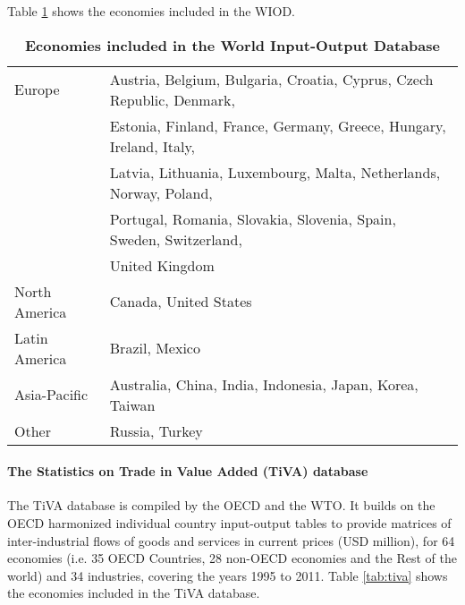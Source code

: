 \documentclass[11pt,a4paper]{article}
\begin{document}

Table \ref{tab:wiod} shows the economies included in the WIOD.
 
 
\begin{table}[!h]
\begin{threeparttable}
\centering
\centering
\caption{\small{\textbf{Economies included in the World Input-Output Database}}}
\small
\begin{tabular}{ll}
\hline\hline
Europe & Austria, Belgium, Bulgaria, Croatia, Cyprus, Czech Republic, Denmark,\\
& Estonia, Finland, France, Germany, Greece, Hungary, Ireland, Italy,\\
& Latvia, Lithuania, Luxembourg, Malta, Netherlands, Norway, Poland,\\
&Portugal, Romania, Slovakia, Slovenia, Spain, Sweden, Switzerland,\\
& United Kingdom\\
North  America& Canada, United States\\
Latin America & Brazil, Mexico \\
Asia-Pacific & Australia, China, India, Indonesia, Japan, Korea, Taiwan\\
Other & Russia, Turkey\\
\hline\hline
\end{tabular} 
\label{tab:wiod}
\end{threeparttable}
\end{table} 

\paragraph{The Statistics on Trade in Value Added (TiVA) database}
The TiVA database is compiled by the OECD and the WTO. It builds on the OECD harmonized individual country input-output tables to provide matrices of inter-industrial flows of goods and services in current prices (USD million), for 64 economies (i.e. 35 OECD Countries, 28 non-OECD economies and the Rest of the world) and 34 industries, covering the years 1995 to 2011. 
Table \ref{tab:tiva} shows the economies included in the TiVA database.
\end{document}
